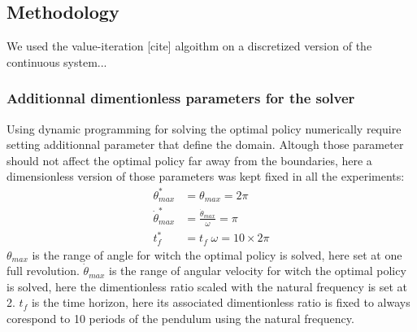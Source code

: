 \subsection{Methodology}

We used the value-iteration [cite] algoithm on a discretized version of the continuous system...

\subsubsection{Additionnal dimentionless parameters for the solver}

Using dynamic programming for solving the optimal policy numerically require setting additionnal parameter that define the domain. Altough those parameter should not affect the optimal policy far away from the boundaries, here a dimensionless version of those parameters was kept fixed in all the experiments:
\begin{align}
\theta^*_{max} &= \theta_{max} = 2 \pi \\
\dot{\theta}^*_{max} &= \frac{ \dot{\theta}_{max} }{\omega} = \pi \\
t^*_{f} &= t_{f} \; \omega = 10 \times 2 \pi 
\end{align}
$\theta_{max}$ is the range of angle for witch the optimal policy is solved, here set at one full revolution. $\dot{\theta}_{max}$ is the range of angular velocity for witch the optimal policy is solved, here the dimentionless ratio scaled with the natural frequency is set at 2. $t_{f}$ is the time horizon, here its associated dimentionless ratio is fixed to always corespond to 10 periods of the pendulum using the natural frequency.



